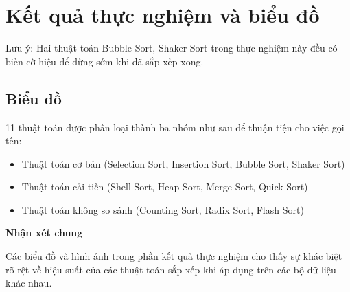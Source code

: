 \section{Kết quả thực nghiệm và biểu đồ}

Lưu ý: Hai thuật toán Bubble Sort, Shaker Sort trong thực nghiệm này đều có biến cờ hiệu để dừng sớm khi đã sắp xếp xong. 



\subsection{Biểu đồ}

11 thuật toán được phân loại thành ba nhóm như sau để thuận tiện cho việc gọi tên: 
\begin{itemize}
    \item Thuật toán cơ bản (Selection Sort, Insertion Sort, Bubble Sort, Shaker Sort)
    \item Thuật toán cải tiến (Shell Sort, Heap Sort, Merge Sort, Quick Sort)
    \item Thuật toán không so sánh (Counting Sort, Radix Sort, Flash Sort)
\end{itemize}




\textbf{Nhận xét chung}

Các biểu đồ và hình ảnh trong phần kết quả thực nghiệm cho thấy sự khác biệt rõ rệt về hiệu suất của các thuật toán sắp xếp khi áp dụng trên các bộ dữ liệu khác nhau. 

